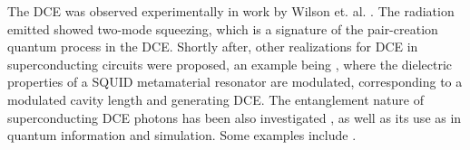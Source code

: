 \newpage
The DCE was observed experimentally in work by Wilson et. al. \cite{Wilson2011_ObservationDCE}. The radiation emitted showed two-mode squeezing, which is a signature of the pair-creation quantum process in the DCE. Shortly after, other realizations for DCE in superconducting circuits were proposed, an example being \cite{Lahteenmaki_DCE2013}, where the dielectric properties of a SQUID metamaterial resonator are modulated, corresponding to a modulated cavity length and generating DCE. The entanglement nature of superconducting DCE photons has been also investigated \cite{Johansson2013}, as well as its use as in quantum information and simulation. Some examples include \cite{Felicetti2014, Peropadre2018, Agusti2019, Zhao2021}.